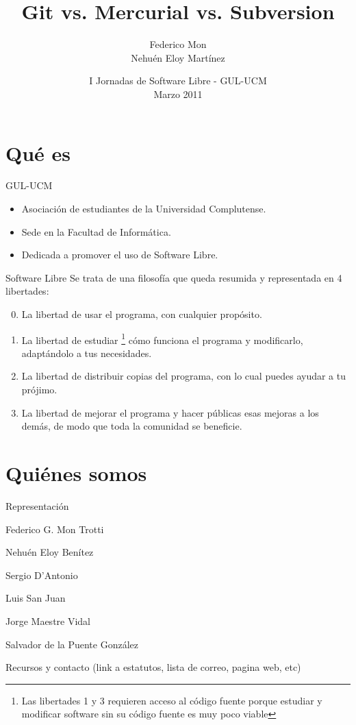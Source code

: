 \documentclass[spanish]{beamer}
\title[Git vs. Mercurial vs. SVN - GUL-UCM]
{Git vs. Mercurial vs. Subversion
}
\author[\url{http://gulucm.org}]
{
Federico Mon \\
Nehuén Eloy Martínez
}
\institute{Facultad de Informática.\\Universidad Complutense de Madrid.}
\date{
I Jornadas de Software Libre - GUL-UCM\\
Marzo 2011}
\begin{document}
\frame{\titlepage}
\section{Qué es}
\begin{frame}{GUL-UCM}
\begin{itemize}
\item Asociación de estudiantes de la Universidad Complutense.
\item Sede en la Facultad de Informática.
\item Dedicada a promover el uso de Software Libre.
\end{itemize}
\end{frame}
\begin{frame}{Software Libre}
Se trata de una filosofía que queda resumida y representada en 4 libertades:
\begin{enumerate}
\setcounter{enumi}{-1}
\item La libertad de usar el programa, con cualquier propósito.
\item La libertad de estudiar \footnote{Las libertades 1 y 3 requieren acceso
al código fuente porque estudiar y modificar software sin su código fuente es
muy poco viable} cómo funciona el programa y modificarlo, adaptándolo a tus
necesidades.
\item La libertad de distribuir copias del programa, con lo cual puedes ayudar
a tu prójimo.
\item La libertad de mejorar el programa y hacer públicas esas mejoras a los
demás, de modo que toda la comunidad se beneficie.
\end{enumerate}
\end{frame}

\section{Quiénes somos}
\begin{frame}{Representación}
\begin{description}[Left]
\item [Presidente:] Federico G. Mon Trotti
\item [Vicepresidente:] Nehuén Eloy Benítez
\item [Secretario:] Sergio D'Antonio
\item [Tesorero:] Luis San Juan
\item [Vocal de representación estudiantil:] Jorge Maestre Vidal
\item [Vocal de actividades:] Salvador de la Puente González
\end{description}
\end{frame}
\begin{frame}{Recursos y contacto}
(link a estatutos, lista de correo, pagina web, etc)
\end{frame}
\end{document}
